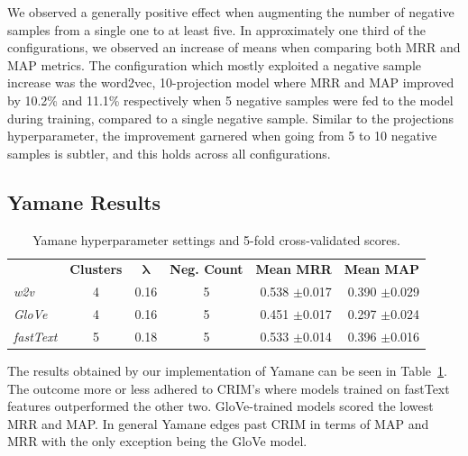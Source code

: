 We observed a generally positive effect when augmenting the number of negative samples from a single one to at least five.  In approximately one third of the configurations, we observed an increase of means when  comparing both \ac{MRR} and \ac{MAP} metrics.  The configuration which mostly exploited a negative sample increase was the word2vec, 10-projection model where \ac{MRR} and \ac{MAP} improved by 10.2\% and 11.1\% respectively when 5 negative samples were fed to the model during training, compared to a single negative sample.  Similar to the projections hyperparameter, the improvement garnered when going from 5 to 10 negative samples is subtler, and this holds across all configurations.  

\subsection{Yamane Results}
\begin{table}\centering
    \begin{tabular}{@{}lcccrr@{}} \toprule
    & \textbf{Clusters} & $\bm{\lambda}$ & \textbf{Neg. Count} & \textbf{Mean MRR} & \textbf{Mean MAP}\\
    \cmidrule{2-6}
    \textit{w2v} & 4 & 0.16 & 5 & 0.538 $\pm$0.017 & 0.390 $\pm$0.029\\
    \textit{GloVe} & 4 & 0.16 & 5 & 0.451 $\pm$0.017 & 0.297 $\pm$0.024\\
    \textit{fastText} & 5 & 0.18 & 5 & 0.533 $\pm$0.014 & 0.396 $\pm$0.016\\
    \bottomrule
    \end{tabular}
    \caption{Yamane hyperparameter settings and 5-fold cross-validated scores.}\label{tab:yamane_settings_scores}
\end{table}
The results obtained by our implementation of Yamane can be seen in Table~\ref{tab:yamane_settings_scores}.  The outcome more or less adhered to CRIM's where models trained on fastText features outperformed the other two.  GloVe-trained models scored the lowest \ac{MRR} and \ac{MAP}.  In general Yamane edges past CRIM in terms of \ac{MAP} and \ac{MRR} with the only exception being the GloVe model.

